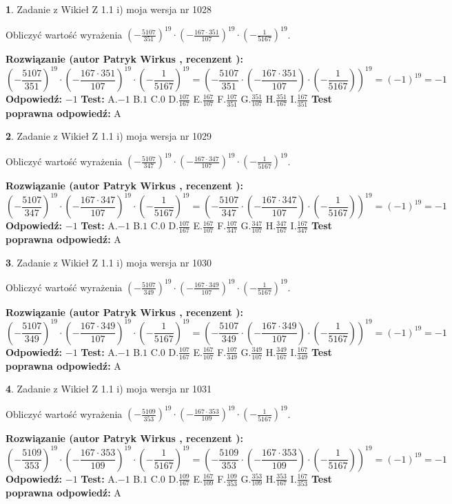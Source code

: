 \documentclass[12pt, a4paper]{article}
\theoremstyle{definition} %
\newtheorem{zad}{}
\newcommand{\zadStart}[1]{\begin{zad}#1\newline}
\newcommand{\zadStop}{\end{zad}}
\newcommand{\rozwStart}[2]{\noindent \textbf{Rozwiązanie (autor #1 , recenzent #2): }\newline}
\newcommand{\rozwStop}{\newline}
\newcommand{\odpStart}{\noindent \textbf{Odpowiedź:}\newline}
\newcommand{\odpStop}{\newline}
\newcommand{\testStart}{\noindent \textbf{Test:}\newline}
\newcommand{\testStop}{\newline}
\newcommand{\kluczStart}{\noindent \textbf{Test poprawna odpowiedź:}\newline}
\newcommand{\kluczStop}{\newline}
\begin{document}
\zadStart{Zadanie z Wikieł Z 1.1 i) moja wersja nr 1028}

Obliczyć wartość wyrażenia $(-\frac{5107}{351})^{19} \cdot (-\frac{167 \cdot 351}{107})^{19} \cdot (-\frac{1}{5167})^{19}$.
\zadStop
\rozwStart{Patryk Wirkus}{}
$$(-\frac{5107}{351})^{19} \cdot (-\frac{167 \cdot 351}{107})^{19} \cdot (-\frac{1}{5167})^{19} = (-\frac{5107}{351} \cdot (-\frac{167 \cdot 351}{107}) \cdot (-\frac{1}{5167}))^{19} = (-1)^{19} = -1$$
\rozwStop
\odpStart
$-1$
\odpStop
\testStart
A.$-1$ B.$1$ C.$0$ D.$\frac{107}{167}$ E.$\frac{167}{107}$
F.$\frac{107}{351}$ G.$\frac{351}{107}$
H.$\frac{351}{167}$
I.$\frac{167}{351}$
\testStop
\kluczStart
A
\kluczStop



\zadStart{Zadanie z Wikieł Z 1.1 i) moja wersja nr 1029}

Obliczyć wartość wyrażenia $(-\frac{5107}{347})^{19} \cdot (-\frac{167 \cdot 347}{107})^{19} \cdot (-\frac{1}{5167})^{19}$.
\zadStop
\rozwStart{Patryk Wirkus}{}
$$(-\frac{5107}{347})^{19} \cdot (-\frac{167 \cdot 347}{107})^{19} \cdot (-\frac{1}{5167})^{19} = (-\frac{5107}{347} \cdot (-\frac{167 \cdot 347}{107}) \cdot (-\frac{1}{5167}))^{19} = (-1)^{19} = -1$$
\rozwStop
\odpStart
$-1$
\odpStop
\testStart
A.$-1$ B.$1$ C.$0$ D.$\frac{107}{167}$ E.$\frac{167}{107}$
F.$\frac{107}{347}$ G.$\frac{347}{107}$
H.$\frac{347}{167}$
I.$\frac{167}{347}$
\testStop
\kluczStart
A
\kluczStop



\zadStart{Zadanie z Wikieł Z 1.1 i) moja wersja nr 1030}

Obliczyć wartość wyrażenia $(-\frac{5107}{349})^{19} \cdot (-\frac{167 \cdot 349}{107})^{19} \cdot (-\frac{1}{5167})^{19}$.
\zadStop
\rozwStart{Patryk Wirkus}{}
$$(-\frac{5107}{349})^{19} \cdot (-\frac{167 \cdot 349}{107})^{19} \cdot (-\frac{1}{5167})^{19} = (-\frac{5107}{349} \cdot (-\frac{167 \cdot 349}{107}) \cdot (-\frac{1}{5167}))^{19} = (-1)^{19} = -1$$
\rozwStop
\odpStart
$-1$
\odpStop
\testStart
A.$-1$ B.$1$ C.$0$ D.$\frac{107}{167}$ E.$\frac{167}{107}$
F.$\frac{107}{349}$ G.$\frac{349}{107}$
H.$\frac{349}{167}$
I.$\frac{167}{349}$
\testStop
\kluczStart
A
\kluczStop



\zadStart{Zadanie z Wikieł Z 1.1 i) moja wersja nr 1031}

Obliczyć wartość wyrażenia $(-\frac{5109}{353})^{19} \cdot (-\frac{167 \cdot 353}{109})^{19} \cdot (-\frac{1}{5167})^{19}$.
\zadStop
\rozwStart{Patryk Wirkus}{}
$$(-\frac{5109}{353})^{19} \cdot (-\frac{167 \cdot 353}{109})^{19} \cdot (-\frac{1}{5167})^{19} = (-\frac{5109}{353} \cdot (-\frac{167 \cdot 353}{109}) \cdot (-\frac{1}{5167}))^{19} = (-1)^{19} = -1$$
\rozwStop
\odpStart
$-1$
\odpStop
\testStart
A.$-1$ B.$1$ C.$0$ D.$\frac{109}{167}$ E.$\frac{167}{109}$
F.$\frac{109}{353}$ G.$\frac{353}{109}$
H.$\frac{353}{167}$
I.$\frac{167}{353}$
\testStop
\kluczStart
A
\kluczStop
\end{document}
